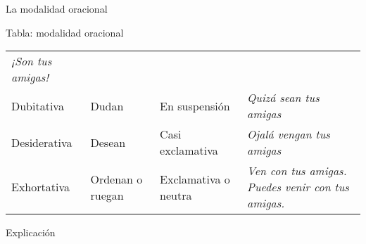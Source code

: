 \documentclass[ignorenonframetext,]{beamer}
\begin{document}
\begin{frame}{La modalidad oracional}
\begin{block}{Tabla: modalidad oracional}
\begin{longtable}[]{@{}llll@{}}
\begin{minipage}[t]{0.41\columnwidth}
\emph{¡Son tus amigas!}\strut
\end{minipage}\tabularnewline
\begin{minipage}[t]{0.15\columnwidth}\raggedright
Dubitativa\strut
\end{minipage} & \begin{minipage}[t]{0.14\columnwidth}\raggedright
Dudan\strut
\end{minipage} & \begin{minipage}[t]{0.18\columnwidth}\raggedright
En suspensión\strut
\end{minipage} & \begin{minipage}[t]{0.41\columnwidth}\raggedright
\emph{Quizá sean tus amigas}\strut
\end{minipage}\tabularnewline
\begin{minipage}[t]{0.15\columnwidth}\raggedright
Desiderativa\strut
\end{minipage} & \begin{minipage}[t]{0.14\columnwidth}\raggedright
Desean\strut
\end{minipage} & \begin{minipage}[t]{0.18\columnwidth}\raggedright
Casi exclamativa\strut
\end{minipage} & \begin{minipage}[t]{0.41\columnwidth}\raggedright
\emph{Ojalá vengan tus amigas}\strut
\end{minipage}\tabularnewline
\begin{minipage}[t]{0.15\columnwidth}\raggedright
Exhortativa\strut
\end{minipage} & \begin{minipage}[t]{0.14\columnwidth}\raggedright
Ordenan o ruegan\strut
\end{minipage} & \begin{minipage}[t]{0.18\columnwidth}\raggedright
Exclamativa o neutra\strut
\end{minipage} & \begin{minipage}[t]{0.41\columnwidth}\raggedright
\emph{Ven con tus amigas.} \emph{Puedes venir con tus amigas.}\strut
\end{minipage}\tabularnewline
\bottomrule
\end{longtable}

\end{block}

\begin{block}{Explicación}


\end{block}
\end{frame}
\end{document}
